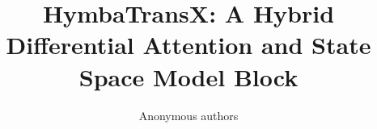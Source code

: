 \title{\textbf{HymbaTransX: A Hybrid Differential Attention and State Space Model Block}}

\author{Anonymous authors}
